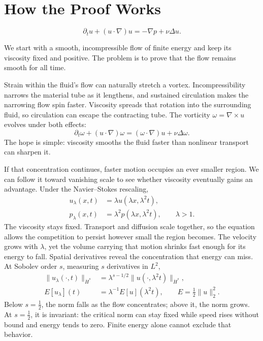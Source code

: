 \begingroup
\setlength{\parindent}{0pt}
\setlength{\parskip}{0.40\baselineskip}
\setlength{\abovedisplayskip}{6.5pt plus 1.5pt minus 1.5pt}
\setlength{\belowdisplayskip}{6.5pt plus 1.5pt minus 1.5pt}
\setlength{\jot}{5pt}

\section*{How the Proof Works}

\[
 \partial_tu+(u\cdot\nabla)u=-\nabla p+\nu\Delta u.
\]

We start with a smooth, incompressible flow of finite energy and keep its
viscosity fixed and positive. The problem is to prove that the flow remains
smooth for all time.

Strain within the fluid's flow can naturally stretch a vortex. Incompressibility
narrows the material tube as it lengthens, and sustained circulation makes the
narrowing flow spin faster. Viscosity spreads that rotation into the surrounding
fluid, so circulation can escape the contracting tube. The vorticity
\(\omega=\nabla\times u\) evolves under both effects:
\[
 \partial_t\omega+(u\cdot\nabla)\omega
 =(\omega\cdot\nabla)u+\nu\Delta\omega.
\]
The hope is simple: viscosity smooths the fluid faster than nonlinear
transport can sharpen it.

If that concentration continues, faster motion occupies an ever smaller
region. We can follow it toward vanishing scale to see whether viscosity
eventually gains an advantage. Under the Navier--Stokes rescaling,
\[
 \begin{aligned}
 u_\lambda(x,t)&=\lambda u(\lambda x,\lambda^2t),\\
 p_\lambda(x,t)&=\lambda^2p(\lambda x,\lambda^2t),
 \qquad \lambda>1.
 \end{aligned}
\]
The viscosity stays fixed. Transport and diffusion scale together, so the
equation allows the competition to persist however small the region becomes.
The velocity grows with \(\lambda\), yet the volume carrying that motion
shrinks fast enough for its energy to fall. Spatial derivatives reveal the
concentration that energy can miss. At Sobolev order \(s\), measuring \(s\)
derivatives in \(L^2\),
\[
 \begin{aligned}
 \|u_\lambda(\cdot,t)\|_{\dot H^s}
 &=\lambda^{s-1/2}\|u(\cdot,\lambda^2t)\|_{\dot H^s},\\
 E[u_\lambda](t)&=\lambda^{-1}E[u](\lambda^2t),
 \qquad E=\tfrac12\|u\|_2^2.
 \end{aligned}
\]
Below \(s=\tfrac12\), the norm falls as the flow concentrates; above it,
the norm grows. At \(s=\tfrac12\), it is invariant: the critical norm can
stay fixed while speed rises without bound and energy tends to zero.
Finite energy alone cannot exclude that behavior.

